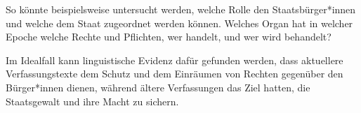 So könnte beispielsweise untersucht werden, welche Rolle den Staatsbürger*innen und welche dem Staat zugeordnet werden können. Welches Organ hat in welcher Epoche welche Rechte und Pflichten, wer handelt, und wer wird behandelt?

Im Idealfall kann linguistische Evidenz dafür gefunden werden, dass aktuellere Verfassungstexte dem Schutz und dem Einräumen von Rechten gegenüber den Bürger*innen dienen, während ältere Verfassungen das Ziel hatten, die Staatsgewalt und ihre Macht zu sichern.






